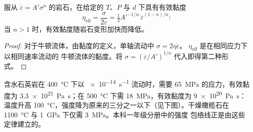 \begin{proposition}[有效黏度]\label{prop:b3:deformation-mechanisms:viscosity}
服从 $\dot\varepsilon = A'\sigma^n$ 的岩石，在给定的 $T$、$P$ 与
$d$ 下具有有效黏度
\[
  \eta_{\mathrm{eff}} = \frac{\sigma}{2\dot\varepsilon}
  = \tfrac12A'^{-1/n}\,\dot\varepsilon^{(1-n)/n}:
\]
当 $n > 1$ 时，有效黏度随岩石变形加快而降低。
\end{proposition}

\begin{proof}
对于牛顿流体，由黏度的定义，单轴流动中 $\sigma = 2\eta\dot\varepsilon$。
$\eta_{\mathrm{eff}}$ 是在相同应力下以相同速率流动的
牛顿流体的黏度。将
$\sigma = (\dot\varepsilon/A')^{1/n}$ 代入即得第二种形式。
\end{proof}

含水石英岩在 \qty{400}{\celsius} 下以 \qty{e-14}{s^{-1}} 流动时，需要
\qty{65}{MPa} 的应力，有效黏度为 \qty{3.3e21}{Pa.s}；在
\qty{500}{\celsius} 下需 \qty{18}{MPa}，有效黏度为 \qty{9e20}{Pa.s}：温度升高
\qty{100}{\celsius}，强度降为原来的三分之一以下（见下图）。干燥橄榄石在
\qty{1100}{\celsius} 与 \qty{1}{GPa} 下仅需 \qty{3}{MPa}。本科一年级分册中的强度
包络线正是由这些定律建立的。

